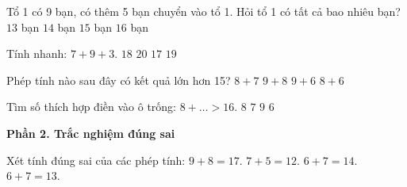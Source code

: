 \begin{ex} %
Tổ 1 có 9 bạn, có thêm 5 bạn chuyển vào tổ 1. Hỏi tổ 1 có tất cả bao nhiêu bạn?
\choice
{$13$ bạn}
{\True $14$ bạn}
{$15$ bạn}
{$16$ bạn}
\end{ex}

\begin{ex} %
Tính nhanh: $7 + 9 + 3$.
\choice
{$18$}
{$20$}
{$17$}
{\True $19$}
\end{ex}

\begin{ex} %
Phép tính nào sau đây có kết quả lớn hơn 15?
\choice
{$8 + 7$}
{\True $9 + 8$}
{$9 + 6$}
{$8 + 6$}
\end{ex}

\begin{ex} %
Tìm số thích hợp điền vào ô trống: $8 + \dots > 16$.
\choice
{$8$}
{$7$}
{\True $9$}
{$6$}
\end{ex}

\textbf{Phần 2. Trắc nghiệm đúng sai}

\begin{ex} %
Xét tính đúng sai của các phép tính:
\choiceTF
{\True $9 + 8 = 17$.}
{\True $7 + 5 = 12$.}
{$6 + 7 = 14$.}
{\True $6 + 7 = 13$.}
\end{ex}

